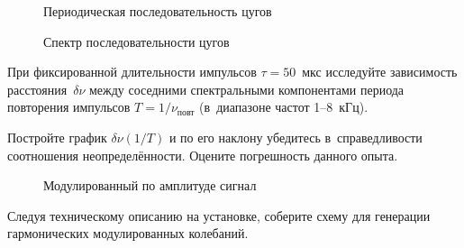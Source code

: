 \begin{lab:task}
\begin{figure}[h!]
    \hfil\hfil
    \begin{minipage}[b]{0.45\textwidth}
        \caption{Периодическая последовательность цугов}
    \end{minipage}
    \hfil
    \begin{minipage}[b]{0.45\textwidth}
        \centering
        \caption{Спектр последовательности цугов}
    \end{minipage}
\end{figure}


\item При фиксированной длительности импульсов $\tau=50$~мкс исследуйте
зависимость расстояния~$\delta \nu$ между соседними спектральными компонентами
периода повторения импульсов $T=1/\nu_\text{повт}$
(в~диапазоне частот 1--8~кГц).

\item Постройте график $\delta \nu(1/T)$ и по его наклону
убедитесь в~справедливости соотношения неопределённости.
Оцените погрешность данного опыта.




\begin{figure}[h!]
    \centering
{}
    \caption{Модулированный по амплитуде сигнал}
\end{figure}

\item Следуя техническому описанию на установке, соберите схему для
генерации гармонических модулированных колебаний.


\end{lab:task}
